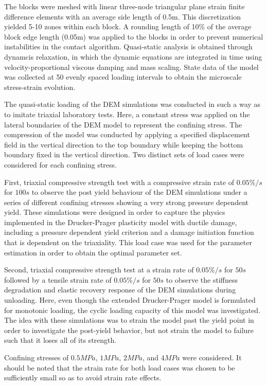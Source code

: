 The blocks were meshed with linear three-node triangular plane strain finite difference elements with an average side length of 0.5m. This discretization yielded 5-10 zones within each block. A rounding length of 10\% of the average block edge length (0.05m) was applied to the blocks in order to prevent numerical instabilities in the contact algorithm. Quasi-static analysis is obtained through dynamcis relaxation, in which the dynamic equations are integrated in time using velocity-proportional viscous damping and mass scaling. State data of the model was collected at 50 evenly spaced loading intervals to obtain the microscale stress-strain evolution. 

The quasi-static loading of the DEM simulations was conducted in such a way as to imitate triaxial laboratory tests. Here, a constant stress was applied on the lateral boundaries of the DEM model to represent the confining stress. The compression of the model was conducted by applying a specified displacement field in the vertical direction to the top boundary while keeping the bottom boundary fixed in the vertical direction. Two distinct sets of load cases were considered for each confining stress. 

First, triaxial compressive strength test with a compressive strain rate of $0.05\%/s$ for $100s$ to observe the post yield behaviour of the DEM simulations under a series of different confining stresses showing a very strong pressure dependent yield. These simulations were designed in order to capture the physics implemented in the Drucker-Prager plasticity model with ductile damage, including a pressure dependent yield criterion and a damage initiation function that is dependent on the triaxiality. This load case was used for the parameter estimation in order to obtain the optimal parameter set.

Second, triaxial compressive strength test at a strain rate of $0.05\%/s$ for $50s$ followed by a tensile strain rate of $0.05\%/s$ for $50s$ to observe the stiffness degradation and elastic recovery response of the DEM simulations during unloading. Here, even though the extended Drucker-Prager model is formulated for monotonic loading, the cyclic loading capacity of this model was investigated. The idea with these simulations was to strain the model past the yield point in order to investigate the post-yield behavior, but not strain the model to failure such that it loses all of its strength. 

Confining stresses of $0.5MPa$, $1MPa$, $2MPa$, and $4MPa$ were considered. It should be noted that the strain rate for both load cases was chosen to be sufficiently small so as to avoid strain rate effects.
